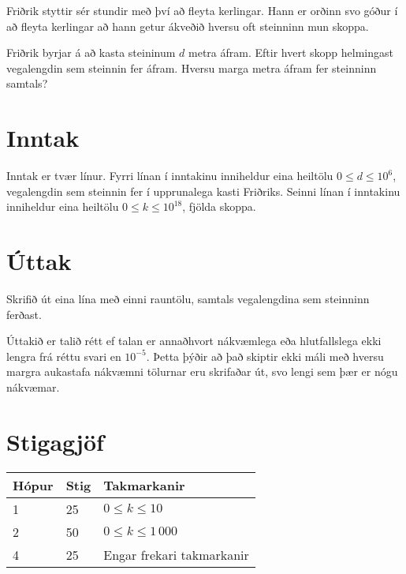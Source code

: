 
Friðrik styttir sér stundir með því að fleyta kerlingar.
Hann er orðinn svo góður í að fleyta kerlingar að hann getur
ákveðið hversu oft steinninn mun skoppa.

Friðrik byrjar á að kasta steininum $d$ metra áfram.
Eftir hvert skopp helmingast vegalengdin sem steinnin fer áfram.
Hversu marga metra áfram fer steinninn samtals?

\section*{Inntak}
Inntak er tvær línur.
Fyrri línan í inntakinu inniheldur eina heiltölu $0 \leq d \leq
10^6$, vegalengdin sem steinnin fer í upprunalega kasti Friðriks.
Seinni línan í inntakinu inniheldur eina heiltölu $0 \leq k \leq 10^{18}$,
fjölda skoppa.

\section*{Úttak}
Skrifið út eina lína með einni rauntölu, samtals vegalengdina sem steinninn ferðast.

Úttakið er talið rétt ef talan er annaðhvort nákvæmlega eða hlutfallslega ekki 
lengra frá réttu svari en $10^{-5}$. Þetta þýðir að það skiptir ekki máli með hversu 
margra aukastafa nákvæmni tölurnar eru skrifaðar út, svo lengi sem þær er nógu nákvæmar.

\section*{Stigagjöf}
\begin{tabular}{|l|l|l|}
\hline
Hópur & Stig & Takmarkanir \\ \hline
1     & 25   & $0 \leq k \leq 10$ \\ \hline
2     & 50   & $0 \leq k \leq 1\,000$ \\ \hline
4     & 25   & Engar frekari takmarkanir\\ \hline
\end{tabular}


